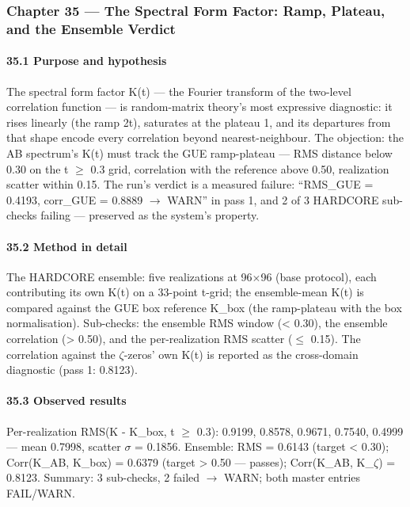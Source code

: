 \documentclass[10pt]{article}
\begin{document}
\subsubsection{Chapter 35 --- The Spectral Form Factor: Ramp, Plateau, and the Ensemble Verdict}

\paragraph{35.1 Purpose and hypothesis}

The spectral form factor K(t) --- the Fourier transform of the two-level correlation function --- is random-matrix theory's most expressive diagnostic: it rises linearly (the ramp 2t), saturates at the plateau 1, and its departures from that shape encode every correlation beyond nearest-neighbour. The objection: the AB spectrum's K(t) must track the GUE ramp-plateau --- RMS distance below 0.30 on the t $\ge$ 0.3 grid, correlation with the reference above 0.50, realization scatter within 0.15. The run's verdict is a measured failure: ``RMS\_GUE = 0.4193, corr\_GUE = 0.8889 $\rightarrow$ WARN'' in pass 1, and 2 of 3 HARDCORE sub-checks failing --- preserved as the system's property.

\paragraph{35.2 Method in detail}

The HARDCORE ensemble: five realizations at 96$\times$96 (base protocol), each contributing its own K(t) on a 33-point t-grid; the ensemble-mean K(t) is compared against the GUE box reference K\_box (the ramp-plateau with the box normalisation). Sub-checks: the ensemble RMS window (< 0.30), the ensemble correlation (> 0.50), and the per-realization RMS scatter ($\le$ 0.15). The correlation against the $\zeta$-zeros' own K(t) is reported as the cross-domain diagnostic (pass 1: 0.8123).

\paragraph{35.3 Observed results}

Per-realization RMS(K - K\_box, t $\ge$ 0.3): 0.9199, 0.8578, 0.9671, 0.7540, 0.4999 --- mean 0.7998, scatter $\sigma$ = 0.1856. Ensemble: RMS = 0.6143 (target < 0.30); Corr(K\_AB, K\_box) = 0.6379 (target > 0.50 --- passes); Corr(K\_AB, K\_$\zeta$) = 0.8123. Summary: 3 sub-checks, 2 failed $\rightarrow$ WARN; both master entries FAIL/WARN.
\end{document}
